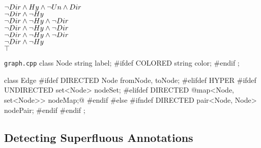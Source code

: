 \begin{frame}[fragile]{\myframetitle}
\begin{mycolumns}[t,columns=3,widths={40,23,37},animation=none]
{\begin{flushright}
				{\color{red}$\neg Dir \wedge Hy \wedge \neg Un \wedge Dir$}\\
				{\color{gray}$\neg Dir \wedge \neg Hy$}\\
				{\color{gray}$\neg Dir \wedge \neg Hy \wedge \neg Dir$}\\
				{\color{gray}$\neg Dir \wedge \neg Hy \wedge \neg Dir$}\\
				{\color{gray}$\neg Dir \wedge \neg Hy \wedge \neg Dir$}\\
				{\color{gray}$\neg Dir \wedge \neg Hy$}\\
				{\color{gray}$\top$}
			\end{flushright}
		}
	\mynextcolumn
		\begin{cpptight}[basicstyle=\small]{\texttt{graph.cpp}}
class Node {
	string label;
#ifdef COLORED
	string color;
#endif
};

class Edge {
#ifdef DIRECTED
	Node fromNode, toNode;
#elifdef HYPER
#ifdef UNDIRECTED
	set<Node> nodeSet;
#elifdef DIRECTED
	@map<Node, set<Node>> nodeMap;@
#endif
#else
#ifndef DIRECTED
	pair<Node, Node> nodePair;
#endif
#endif
};
		\end{cpptight}
	\end{mycolumns}
\end{frame}


\subsection{Detecting Superfluous Annotations}


